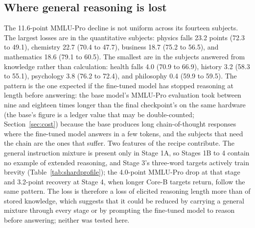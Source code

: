 \documentclass[twocolumn]{svjour3}
\begin{document}
\subsection{Where general reasoning is lost}\label{sec:mmlu}
The 11.6-point MMLU-Pro decline is not uniform across its fourteen subjects. The largest losses are in the quantitative subjects: physics falls 23.2 points (72.3 to 49.1), chemistry 22.7 (70.4 to 47.7), business 18.7 (75.2 to 56.5), and mathematics 18.6 (79.1 to 60.5). The smallest are in the subjects answered from knowledge rather than calculation: health falls 4.0 (70.9 to 66.9), history 3.2 (58.3 to 55.1), psychology 3.8 (76.2 to 72.4), and philosophy 0.4 (59.9 to 59.5). The pattern is the one expected if the fine-tuned model has stopped reasoning at length before answering: the base model's MMLU-Pro evaluation took between nine and eighteen times longer than the final checkpoint's on the same hardware (the base's figure is a ledger value that may be double-counted; Section~\ref{sec:cost}) because the base produces long chain-of-thought responses where the fine-tuned model answers in a few tokens, and the subjects that need the chain are the ones that suffer. Two features of the recipe contribute. The general instruction mixture is present only in Stage 1A, so Stages 1B to 4 contain no example of extended reasoning, and Stage 3's three-word targets actively train brevity (Table~\ref{tab:shardprofile}); the 4.0-point MMLU-Pro drop at that stage and 3.2-point recovery at Stage 4, when longer Core-B targets return, follow the same pattern. The loss is therefore a loss of elicited reasoning length more than of stored knowledge, which suggests that it could be reduced by carrying a general mixture through every stage or by prompting the fine-tuned model to reason before answering; neither was tested here.
\end{document}
